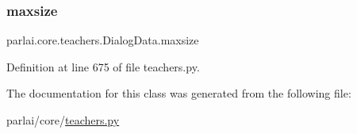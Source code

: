 \mbox{\label{classparlai_1_1core_1_1teachers_1_1DialogData_a9c25f1914274bbc5b6aeae335e98957a}} 
\subsubsection{\texorpdfstring{maxsize}{maxsize}}
{\footnotesize\ttfamily parlai.\+core.\+teachers.\+Dialog\+Data.\+maxsize\hspace{0.3cm}{\ttfamily [static]}}



Definition at line 675 of file teachers.\+py.



The documentation for this class was generated from the following file\+:\begin{DoxyCompactItemize}
\item 
parlai/core/\hyperlink{teachers_8py}{teachers.\+py}\end{DoxyCompactItemize}
